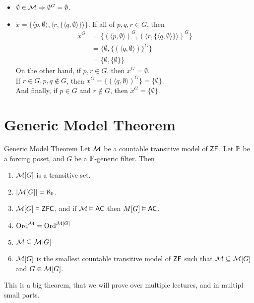 \documentclass{article}
\begin{document}
\begin{ex*}\hspace{0.1cm}
    \begin{itemize}
        \item $\emptyset \in \mathcal{M} \Rightarrow \emptyset^{G} = \emptyset$.
        \item $\dot{x} = \{ \langle p, \emptyset \rangle, \langle r, \{ \langle q, \emptyset \rangle \} \rangle \}$. If all of $p,q,r \in G$, then \begin{align*}
                  \dot{x}^{G} & = \{ ( \langle p, \emptyset \rangle)^{G}, (\langle r, \{ \langle q, \emptyset \rangle \} \rangle )^{G} \} \\
                              & = \{ \emptyset, \{(\langle q, \emptyset \rangle)\}^{G}\}                                                  \\
                              & = \{ \emptyset, \{ \emptyset \}\}
              \end{align*}
              On the other hand, if $p,r \in G$, then $\dot{x}^{G} = \emptyset$.\\
              If $r \in G, p,q \notin G$, then $\dot{x}^{G} = \{(\langle q, \emptyset \rangle)^{G} \} = \{\emptyset\}$. \\And finally, if $p \in G$ and $r \notin G$, then $\dot{x}^{G} = \{\emptyset\}$.
    \end{itemize}
\end{ex*}
\section{Generic Model Theorem}
\begin{fancythm}{Generic Model Theorem}
    Let $\mathcal{M}$ be a countable transitive model of $\mathsf{ZF}$. Let $\mathbb{P}$ be a forcing poset, and $G$ be a $\mathbb{P}$-generic filter. Then \begin{enumerate}
        \item[(i)] $\mathcal{M}[G]$ is a transitive set.
        \item[(ii)] $|\mathcal{M}[G]| = \aleph_{0}$.
        \item[(iii)] $\mathcal{M}[G] \vDash \mathsf{ZFC}$, and if $\mathcal{M} \vDash \mathsf{AC}$ then $M[G] \vDash \mathsf{AC}$.
        \item[(iv)] $\operatorname{Ord}^{\mathcal{M}} = \operatorname{Ord}^{\mathcal{M}[G]}$
        \item[(v)] $\mathcal{M} \subseteq \mathcal{M}[G]$
        \item[(vi)] $\mathcal{M}[G]$ is the smallest countable transitive model of $\mathsf{ZF}$ such that $\mathcal{M} \subseteq \mathcal{M}[G]$ and $G \in \mathcal{M}[G]$.
    \end{enumerate}
\end{fancythm}
This is a big theorem, that we will prove over multiple lectures, and in multipl small parts.
\end{document}
